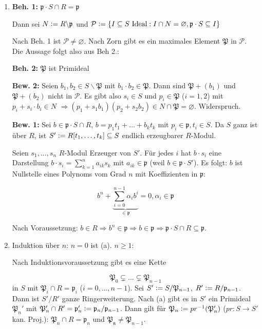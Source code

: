 \documentclass[a4paper, 10pt]{report}
\begin{document}
\begin{Bew}
\begin{enumerate}
\item \textbf{Beh. 1: } $\mathfrak{p}\cdot S \cap R =\mathfrak{p}$

Dann sei $N\mathrel{\mathop:}= R\backslash\mathfrak{p}$ und $\mathcal{P}\mathrel{\mathop:}=
\{I\subseteq S\ \text{Ideal}: I\cap N=\varnothing, \mathfrak{p}\cdot S \subseteq I\}$

Nach Beh. 1 ist $\mathcal{P}\neq \varnothing$. Nach Zorn gibt es ein maximales Element
$\mathfrak{P}$ in $\mathcal{P}$. Die Aussage folgt also aus Beh 2.:

\textbf{Beh. 2: } $\mathfrak{P}$ ist Primideal

\textbf{Bew. 2: } Seien $b_1, b_2\in S\backslash \mathfrak{P}$ mit $b_1\cdot b_2\in \mathfrak{P}$.
Dann sind $\mathfrak{P}+(b_1)$ und $\mathfrak{P}+(b_2)$ nicht in $\mathcal{P}$. Es gibt
also $s_i\in S$ und $p_i\in \mathfrak{P}$ ($i=1,2$) mit $p_i+s_i\cdot b_i\in N$
$\Rightarrow (p_1+s_1b_1)(p_2+s_2b_2)\in N\cap \mathfrak{P}=\varnothing$. Widerspruch.

\textbf{Bew. 1: } Sei $b\in \mathfrak{p}\cdot S\cap R$, $b=p_1t_1+\ldots+b_k t_k$ mit 
$p_i\in \mathfrak{p}, t_i\in S$. Da $S$ ganz ist \"uber $R$, ist 
$S'\mathrel{\mathop:}= R[t_1, \ldots, t_k]\subseteq S$ endlich erzeugbarer $R$-Modul.

Seien $s_1,\ldots, s_n$ $R$-Modul Erzeuger von $S'$. F\"ur jedes $i$ hat $b\cdot s_i$ eine
Darstellung $b\cdot s_i=\sum_{k=1}^{n}a_{ik}s_k$ mit $a_{ik}\in \mathfrak{p}$
(weil $b\in \mathfrak{p}\cdot S'$). Es folgt: $b$ ist Nullstelle eines Polynoms
vom Grad $n$ mit Koeffizienten in $\mathfrak{p}$: 

$$b^n+ \underbrace{\sum_{i=0}^{n-1}\alpha_i b^i}_{\in \mathfrak{p}}=0, \alpha_i\in \mathfrak{p}$$

Nach Voraussetzung: $b\in R\Rightarrow b^n\in \mathfrak{p}\Rightarrow b\in \mathfrak{p}
\Rightarrow \mathfrak{p}\cdot S \cap R\subseteq \mathfrak{p}$.

\item Induktion \"uber $n$: $n=0$ ist (a). $n\geq 1$:

Nach Induktionsvoraussetzung gibt es eine Kette

$$\mathfrak{P}_0\subsetneq\ldots\subsetneq\mathfrak{P}_{n-1}$$ 
in $S$ mit $\mathfrak{P}_i\cap R=\mathfrak{p}_i$ ($i=0,\ldots, n-1$). Sei
$S'\mathrel{\mathop:}= S/\mathfrak{P}_{n-1}$, $R'\mathrel{\mathop:}= R/\mathfrak{p}_{n-1}$. Dann 
ist $S'/R'$ ganze Ringerweiterung. Nach (a) gibt es in $S'$ ein Primideal $\mathfrak{P}_{n}'$
mit $\mathfrak{P}_n'\cap R'=\mathfrak{p}_n'\mathrel{\mathop:}= \mathfrak{p}_n/\mathfrak{p}_{n-1}$.
Dann gilt f\"ur $\mathfrak{P}_n\mathrel{\mathop:}= pr^{-1}(\mathfrak{P}_n')$ ($pr:S\to S'$ kan. Proj.):
$\mathfrak{P}_n\cap R=\mathfrak{p}_n$ und $\mathfrak{P_n}\neq\mathfrak{P}_{n-1}$.


\end{enumerate}
\end{Bew}
\end{document}
